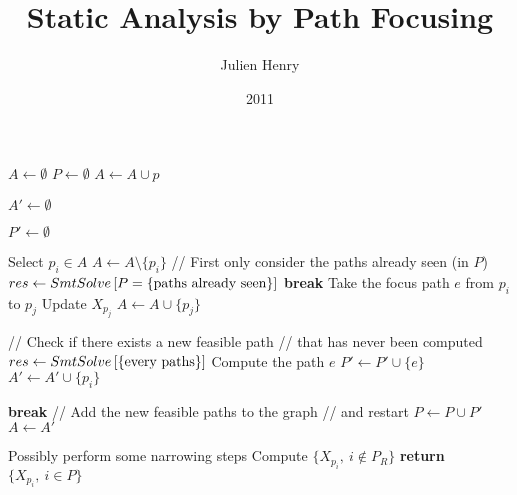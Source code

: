 \documentclass[a4paper,11pt]{article}
\title{Static Analysis by Path Focusing}
\author{Julien Henry}
\date{2011}
\begin{document}
\begin{algorithmic}%
\STATE $A \gets \emptyset$
\STATE $P \gets \emptyset$
	\STATE $A \gets A \cup p$
\ENDFOR

\STATE $A' \gets \emptyset$

\STATE $P' \gets \emptyset$

	\STATE Select $p_i \in A$
	\STATE $A \gets A \setminus \{p_i\}$
	\STATE // First only consider the paths already seen (in $P$)
		\STATE $res \gets SmtSolve\left[
		P = \{ \textnormal{paths already seen} \}
		\right]$
			\STATE \textbf{break}
		\ENDIF
		\STATE Take the focus path $e$ from $p_i$ to $p_j$
		\STATE Update $X_{p_j}$
		\STATE $A \gets A \cup \{p_j\}$
	\ENDWHILE

	\STATE // Check if there exists a new feasible path 
	\STATE // that has never been computed
	\STATE $res \gets SmtSolve\left[
	\{ \textnormal{every paths} \}
	\right]$
		\STATE Compute the path $e$
		\STATE $P' \gets P' \cup \{e\}$
		\STATE $A' \gets A' \cup \{p_i\}$
	\ENDIF

\ENDWHILE

	\STATE \textbf{break}
\ENDIF
\STATE // Add the new feasible paths to the graph
\STATE // and restart 
\STATE $P \gets P \cup P'$
\STATE $A \gets A'$
\ENDWHILE

\STATE Possibly perform some narrowing steps
\STATE Compute $\{X_{p_i},\ i \notin P_R\}$
\STATE \textbf{return} $\{X_{p_i},\ i \in P\}$
\end{algorithmic}

\bigskip
\end{document}
